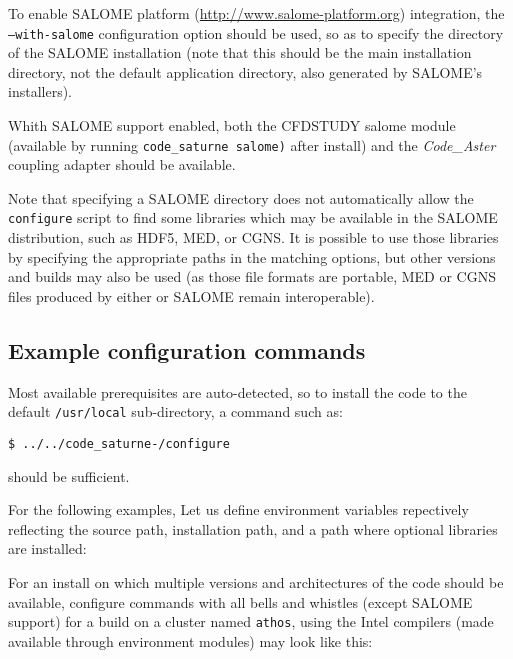 \documentclass[a4paper,10pt,twoside]{csshortdoc}
\begin{document}
To enable SALOME platform (\url{http://www.salome-platform.org}) integration,
the \texttt{--with-salome} configuration option should be used, so as to
specify the directory of the SALOME installation (note that this should be
the main installation directory, not the default application directory,
also generated by SALOME's installers).

Whith SALOME support enabled, both the CFDSTUDY salome module
(available by running \texttt{code\_saturne salome)} after install)
and the \textit{Code\_Aster} coupling adapter should be available.

Note that specifying a SALOME directory does not automatically
allow the \CS \texttt{configure} script to find some libraries
which may be available in the SALOME distribution, such as HDF5,
MED, or CGNS. It is possible to use those libraries by specifying
the appropriate paths in the matching options, but other versions and builds
may also be used (as those file formats are portable, MED or CGNS files produced
by either \CS or SALOME remain interoperable).

\subsection{Example configuration commands\label{sec:config:examples}}

Most available prerequisites are auto-detected, so to install the
code to the default \texttt{/usr/local} sub-directory,
a command such as:

\texttt{\$ ../../code\_saturne-\verscs/configure}

should be sufficient.

For the following examples, Let us define environment variables repectively
reflecting the \CS source path, installation path, and a path where optional
libraries are installed:


For an install on which multiple
versions and architectures of the code should be available,
configure commands with all bells and whistles (except SALOME support) for a
build on a cluster named \texttt{athos}, using the Intel compilers
(made available through environment modules) may look like this:
\end{document}
